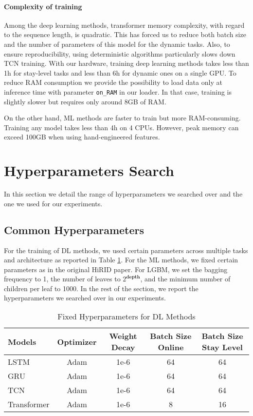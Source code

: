 \documentclass{article}
\begin{document}
\paragraph{Complexity of training}
Among the deep learning methods, transformer memory complexity, with regard to the sequence length, is quadratic. This has forced us to reduce both batch size and the number of parameters of this model for the dynamic tasks. Also, to ensure reproducibility, using deterministic algorithms particularly slows down TCN training. With our hardware, training deep learning methods takes less than 1h for stay-level tasks and less than 6h for dynamic ones on a single GPU.
To reduce RAM consumption we provide the possibility to load data only at inference time with parameter \texttt{on\_RAM} in our loader. In that case, training is slightly slower but requires only around 8GB of RAM.

On the other hand, ML methods are faster to train but more RAM-consuming. Training any model takes less than 4h on 4 CPUs. However, peak memory can exceed 100GB when using hand-engineered features.

\section*{Hyperparameters Search}\label{appsec:hyper-parameters}
In this section we detail the range of hyperparameters we searched over and the one we used for our experiments.
\subsection*{Common Hyperparameters}
For the training of DL methods, we used certain parameters across multiple tasks and architecture as reported in Table \ref{tab:fixed-hp-dl}.
For the ML methods, we fixed certain parameters as in the original HiRID paper. For LGBM, we set the bagging frequency to 1,
the number of leaves to $2^\textbf{depth}$,  and the minimum number of children per leaf to 1000. In the rest of the section, we report the hyperparameters we searched over in our experiments.

\begin{table}[tbh!]
    \centering
    \begin{tabular}{l|c|c|c|c}
        \toprule
        Models & Optimizer  & Weight Decay & Batch Size Online & Batch Size Stay Level  \\
        \midrule
        LSTM & Adam  & 1e-6 & 64  & 64 \\ 
        GRU & Adam  & 1e-6 & 64  & 64 \\
        TCN & Adam  & 1e-6 & 64   & 64\\ 
        Transformer & Adam  & 1e-6 & 8   & 16 \\
        \bottomrule
        \end{tabular}
    \caption{Fixed Hyperparameters for DL Methods }
    \label{tab:fixed-hp-dl}
\end{table}
\end{document}
